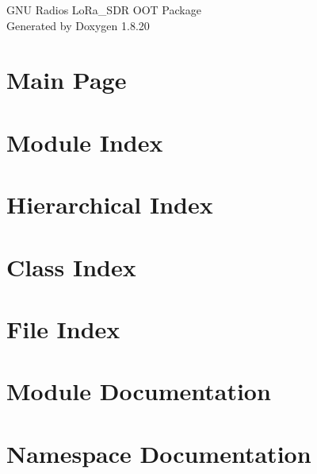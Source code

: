 \let\mypdfximage\pdfximage\def\pdfximage{\immediate\mypdfximage}\documentclass[twoside]{book}
\newcommand{\+}{\discretionary{\mbox{\scriptsize$\hookleftarrow$}}{}{}}
\newcommand{\clearemptydoublepage}{%
  \newpage{\pagestyle{empty}\cleardoublepage}%
}
\begin{document}
\begin{titlepage}
\vspace*{7cm}
\begin{center}%
{\Large G\+NU Radio\textquotesingle{}s Lo\+Ra\+\_\+\+S\+DR O\+OT Package }\\
\vspace*{1cm}
{\large Generated by Doxygen 1.8.20}\\
\end{center}
\end{titlepage}
\clearemptydoublepage
{}
\tableofcontents
\clearemptydoublepage
{}

\chapter{Main Page}
\label{index}\hypertarget{index}{}
\chapter{Module Index}

\chapter{Hierarchical Index}

\chapter{Class Index}

\chapter{File Index}

\chapter{Module Documentation}

\chapter{Namespace Documentation}


\end{document}
